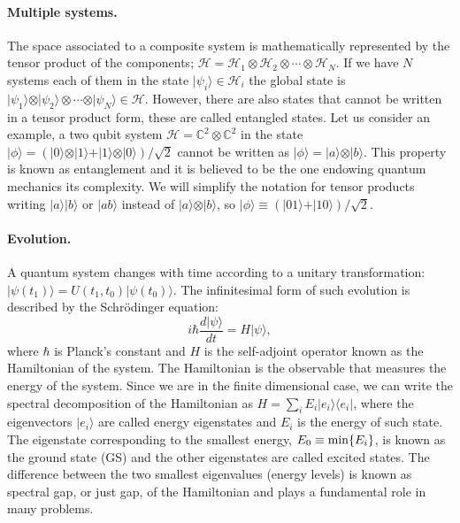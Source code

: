\documentclass[smallextended]{svjour3}
\renewcommand{\1}{\mathbbm{1}}
\newcommand{\ket} [1] {\vert #1 \rangle}
\newcommand{\bra} [1] {\langle #1 \vert}
\begin{document}
\paragraph{Multiple systems.} The space associated to a composite system is mathematically represented by the tensor product of the components; $\mathcal{H}=\mathcal{H}_1\otimes\mathcal{H}_2 \otimes \cdots \otimes \mathcal{H}_N$. If we have $N$  systems each of them in the state $\ket{\psi_i}\in \mathcal{H}_i$ the global state is $\ket{\psi_1}\otimes\ket{\psi_2}\otimes \cdots \otimes \ket{\psi_N}\in \mathcal{H}$. However, there are also states that cannot be written in a tensor product form, these are called entangled states. Let us consider an example, a two qubit system $\mathcal{H}=\mathbb{C}^{2}\otimes\mathbb{C}^{2}$  in the state $\ket{\phi}=(\ket{0}\otimes\ket{1}+\ket{1}\otimes \ket{0})/\sqrt{2}$ cannot be written as $\ket{\phi}= \ket{a}\otimes\ket{b}$. This property is known as entanglement and it is believed to be the one endowing quantum mechanics its complexity. We will simplify the notation for tensor products writing $\ket{a}\ket{b}$ or $\ket{ab}$ instead of $\ket{a}\otimes\ket{b}$, so $\ket{\phi}\equiv (\ket{01}+\ket{10})/\sqrt{2}$.  \\

\paragraph{Evolution.} A quantum system changes with time according to a unitary transformation: $\ket{\psi(t_1)}=U(t_1,t_0)\ket{\psi(t_0)}$. The infinitesimal form of such evolution is described by the Schr\"{o}dinger equation:
\begin{equation}
    i\hbar \frac{d\ket{\psi}}{dt }=H\ket{\psi},
\end{equation}
where $\hbar$ is Planck's constant and $H$ is the self-adjoint operator known as the Hamiltonian of the system.
The Hamiltonian is the observable that measures the energy of the system. Since we are in the finite dimensional case, we can write the spectral decomposition of the Hamiltonian as $H=\sum_i E_i \ket{e_i}\bra{e_i}$, where the eigenvectors $\ket{e_i}$ are called energy eigenstates and $E_i$ is the energy of such state. The eigenstate corresponding to the smallest energy, $E_0\equiv {\rm min}\{E_i\}$, is known as the ground state (GS) and the other eigenstates are called excited states. The difference between the two smallest eigenvalues (energy levels) is known as spectral gap, or just gap, of the Hamiltonian and plays a fundamental role in many problems.\\
\end{document}
